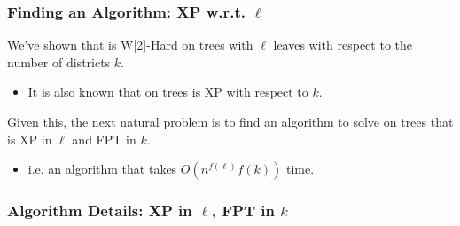 \begin{frame}
    \frametitle{Finding an Algorithm: XP w.r.t. $\ell$}
    We've shown that \gm is W[2]-Hard on trees with $\ell$ leaves with respect to the number of districts $k$.
    \begin{itemize}
        \item It is also known that \gm on trees is XP with respect to $k$.
    \end{itemize}
    \vspace{1.0cm}
    
    Given this, the next natural problem is to find an algorithm to solve \gm on trees that is XP in $\ell$ and FPT in $k$.
    \begin{itemize}
        \item i.e. an algorithm that takes $O(n^{f(\ell)}f(k))$ time.
    \end{itemize}
\end{frame}

\begin{frame}
    \frametitle{Algorithm Details: XP in $\ell$, FPT in $k$}

    \begin{figure}
		\begin{center}
			
		\end{center}
	\end{figure}

    \begin{figure}
        \begin{center}
             {
                
            }
            \hspace{2.0cm}
             {
                
            }
        \end{center}
    \end{figure}
\end{frame}
